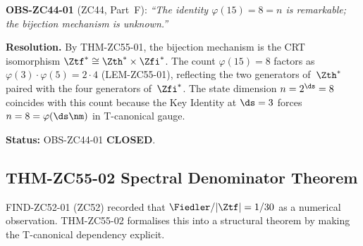 \documentclass[12pt, a4paper]{article}
\begin{document}

\begin{formalbox}[title={COR-ZC55-01: OBS-ZC44-01 Closed ($R_0$)}]
\textbf{OBS-ZC44-01} (ZC44, Part~F):
\emph{``The identity $\varphi(15)=8=n$ is remarkable;
the bijection mechanism is unknown.''}

\medskip
\textbf{Resolution.}
By THM-ZC55-01, the bijection mechanism is the CRT isomorphism
$\Ztf^*\cong\Zth^*\times\Zfi^*$.  The count $\varphi(15)=8$
factors as $\varphi(3)\cdot\varphi(5)=2\cdot4$ (LEM-ZC55-01),
reflecting the two generators of~$\Zth^*$ paired with the four
generators of~$\Zfi^*$.  The state dimension $n=2^{\ds}=8$ coincides
with this count because the Key Identity at $\ds=3$ forces
$n=8=\varphi(\ds\nm)$ in T-canonical gauge.

\medskip
\textbf{Status:} OBS-ZC44-01 \textbf{CLOSED}.
\end{formalbox}

\subsection{THM-ZC55-02 \quad Spectral Denominator Theorem}
\label{sec:thm02}

FIND-ZC52-01 (ZC52) recorded that $\Fiedler/|\Ztf|=1/30$ as a
numerical observation.  THM-ZC55-02 formalises this into a
structural theorem by making the T-canonical dependency explicit.

\end{document}
